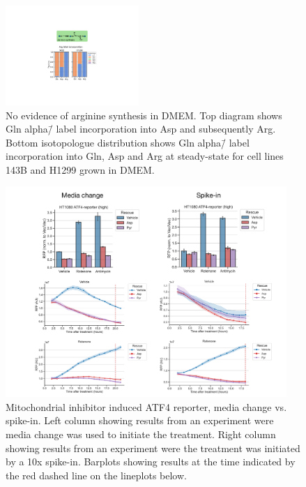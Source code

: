 \begin{figure}
    \centering
    \includegraphics[width=0.45\textwidth]{figures/chap2/app/arg_syn.pdf}
    \caption[No evidence of arginine synthesis in DMEM]{
    No evidence of arginine synthesis in DMEM.
    Top diagram shows Gln alpha\=/\hNi{} label incorporation into Asp and subsequently Arg.
    Bottom isotopologue distribution shows Gln alpha\=/\hNi{} label incorporation into Gln, Asp and Arg at steady-state for cell lines 143B and H1299 grown in DMEM.
    }
    \label{fig:app_ch2:arg_syn}
\end{figure}










\begin{figure}
    \centering
    \includegraphics[width=0.95\textwidth]{figures/chap2/app/atf4_chVSsp.pdf}
    \caption[ATF4 reporter, media change vs. spike-in]{
    Mitochondrial inhibitor induced ATF4 reporter, media change vs. spike-in.
    Left column showing results from an experiment were media change was used to initiate the treatment.
    Right column showing results from an experiment were the treatment was initiated by a 10x spike-in.
    Barplots showing results at the time indicated by the red dashed line on the lineplots below.
    }
    \label{fig:app_ch2:sal_frac_conc}
\end{figure}


